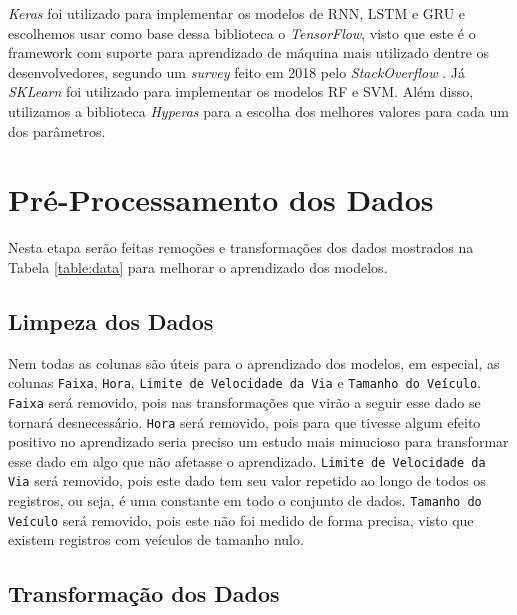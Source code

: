 \textit{Keras} foi utilizado para implementar os modelos de \acrshort{RNN}, \acrshort{LSTM} e \acrshort{GRU} e escolhemos usar como base dessa biblioteca o \textit{TensorFlow}, visto que este é o framework com suporte para aprendizado de máquina mais utilizado dentre os desenvolvedores, segundo um \textit{survey} feito em 2018 pelo \textit{StackOverflow} \cite{stack_2018}. Já \textit{SKLearn} foi utilizado para implementar os modelos \acrshort{RF} e \acrshort{SVM}. Além disso, utilizamos a biblioteca \textit {Hyperas} para a escolha dos melhores valores para cada um dos parâmetros.

\section{Pré-Processamento dos Dados}

Nesta etapa serão feitas remoções e transformações dos dados mostrados na Tabela \ref{table:data} para melhorar o aprendizado dos modelos.

\subsection{Limpeza dos Dados}

Nem todas as colunas são úteis para o aprendizado dos modelos, em especial, as colunas \texttt{Faixa}, \texttt{Hora}, \texttt{Limite de Velocidade da Via} e \texttt{Tamanho do Veículo}. \texttt{Faixa} será removido, pois nas transformações que virão a seguir esse dado se tornará desnecessário. \texttt{Hora} será removido, pois para que tivesse algum efeito positivo no aprendizado  seria preciso um estudo mais minucioso para transformar esse dado em algo que não afetasse o aprendizado. \texttt{Limite de Velocidade da Via} será removido, pois este dado tem seu valor repetido ao longo de todos os registros, ou seja, é uma constante em todo o conjunto de dados. \texttt{Tamanho do Veículo} será removido, pois este não foi medido de forma precisa, visto que existem registros com veículos de tamanho nulo.


\subsection{Transformação dos Dados}


